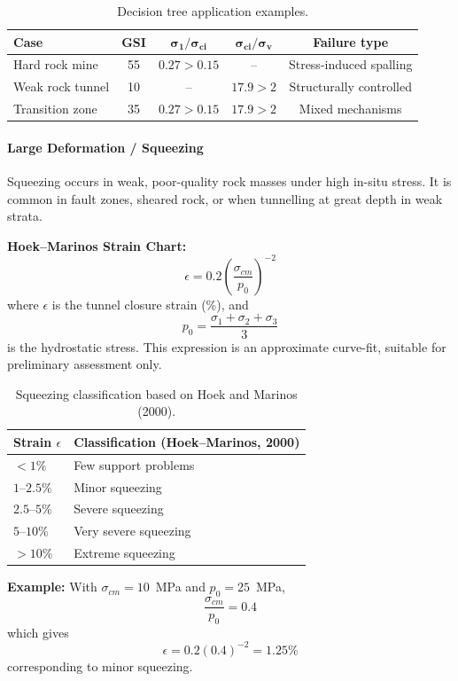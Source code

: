 \begin{table}[ht]
\centering
\begin{tabular}{lcccc}
\toprule
\textbf{Case} & \textbf{GSI} & $\boldsymbol{\sigma_1/\sigma_{ci}}$ & $\boldsymbol{\sigma_{ci}/\sigma_v}$ & \textbf{Failure type} \\
\midrule
Hard rock mine & 55 & $0.27 > 0.15$ & -- & Stress-induced spalling \\
Weak rock tunnel & 10 & -- & $17.9 > 2$ & Structurally controlled \\
Transition zone & 35 & $0.27 > 0.15$ & $17.9 > 2$ & Mixed mechanisms \\
\bottomrule
\end{tabular}
\caption{Decision tree application examples.}
\end{table}

\paragraph{Large Deformation / Squeezing}
Squeezing occurs in weak, poor-quality rock masses under high in-situ stress. It is common in fault zones, sheared rock, or when tunnelling at great depth in weak strata.

\textbf{Hoek--Marinos Strain Chart:}
\[
\boxed{\epsilon = 0.2\left(\frac{\sigma_{cm}}{p_0}\right)^{-2}}
\]
where $\epsilon$ is the tunnel closure strain (\%), and
\[
p_0 = \frac{\sigma_1+\sigma_2+\sigma_3}{3}
\]
is the hydrostatic stress. This expression is an approximate curve-fit, suitable for preliminary assessment only.

\begin{table}[ht]
\centering
\begin{tabular}{ll}
\toprule
\textbf{Strain $\epsilon$} & \textbf{Classification (Hoek--Marinos, 2000)} \\
\midrule
$<1\%$ & Few support problems \\
$1$--$2.5\%$ & Minor squeezing \\
$2.5$--$5\%$ & Severe squeezing \\
$5$--$10\%$ & Very severe squeezing \\
$>10\%$ & Extreme squeezing \\
\bottomrule
\end{tabular}
\caption{Squeezing classification based on Hoek and Marinos (2000).}
\end{table}

\textbf{Example:} With $\sigma_{cm} = 10$~MPa and $p_0 = 25$~MPa,
\[
\frac{\sigma_{cm}}{p_0}=0.4
\]
which gives
\[
\epsilon = 0.2(0.4)^{-2} = 1.25\%
\]
corresponding to minor squeezing.

